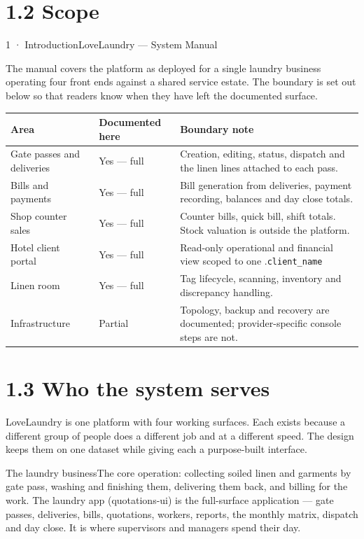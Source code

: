 \documentclass[11pt,a4paper,oneside]{book}
\begin{document}
\section{1.2 Scope}
1 · IntroductionLoveLaundry — System Manual

The manual covers the platform as deployed for a single laundry business operating four front ends against a shared service estate. The boundary is set out below so that readers know when they have left the documented surface.

\begin{center}\small
\begin{tabularx}{\linewidth}{|X|X|X|}
\hline
\rowcolor{lightgrey}
\textbf{Area} & \textbf{Documented here} & \textbf{Boundary note} \\ \hline
Gate passes and deliveries & Yes — full & Creation, editing, status, dispatch and the linen lines attached to each pass. \\ \hline
Bills and payments & Yes — full & Bill generation from deliveries, payment recording, balances and day close totals. \\ \hline
Shop counter sales & Yes — full & Counter bills, quick bill, shift totals. Stock valuation is outside the platform. \\ \hline
Hotel client portal & Yes — full & Read-only operational and financial view scoped to one .\texttt{client\_name} \\ \hline
Linen room & Yes — full & Tag lifecycle, scanning, inventory and discrepancy handling. \\ \hline
Infrastructure & Partial & Topology, backup and recovery are documented; provider-specific console steps are not. \\ \hline
\end{tabularx}
\end{center}
\section{1.3 Who the system serves}
LoveLaundry is one platform with four working surfaces. Each exists because a different group of people does a different job and at a different speed. The design keeps them on one dataset while giving each a purpose-built interface.

The laundry businessThe core operation: collecting soiled linen and garments by gate pass, washing and finishing them, delivering them back, and billing for the work. The laundry app (quotations-ui) is the full-surface application — gate passes, deliveries, bills, quotations, workers, reports, the monthly matrix, dispatch and day close. It is where supervisors and managers spend their day.
\end{document}
